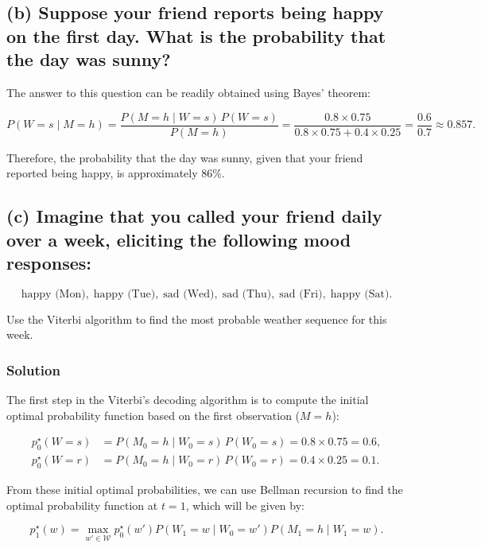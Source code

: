 \subsection*{(b) Suppose your friend reports being happy on the first day. What is the probability that the day was sunny?}

The answer to this question can be readily obtained using Bayes’ theorem:

\[
P(W=s \mid M=h)=
\frac{P(M=h \mid W=s)\,P(W=s)}{P(M=h)}
=
\frac{0.8\times0.75}{0.8\times0.75 + 0.4\times0.25}
=
\frac{0.6}{0.7}\approx0.857.
\]

Therefore, the probability that the day was sunny, given that your friend reported being
happy, is approximately $86\%$.

\subsection*{(c) Imagine that you called your friend daily over a week, eliciting the following mood responses:}

\[
\text{happy (Mon)},\;
\text{happy (Tue)},\;
\text{sad (Wed)},\;
\text{sad (Thu)},\;
\text{sad (Fri)},\;
\text{happy (Sat)}.
\]

Use the Viterbi algorithm to find the most probable weather sequence for this week.

\subsubsection*{Solution}


The first step in the Viterbi’s decoding algorithm is to compute the initial optimal probability
function based on the first observation ($M=h$):

\[
\begin{aligned}
p^\star_0(W=s) &= P(M_0=h \mid W_0=s)\,P(W_0=s)=0.8\times0.75 = 0.6,\\
p^\star_0(W=r) &= P(M_0=h \mid W_0=r)\,P(W_0=r)=0.4\times0.25 = 0.1.
\end{aligned}
\]

From these initial optimal probabilities, we can use Bellman recursion to find the optimal
probability function at $t=1$, which will be given by:

\[
p^\star_1(w)=\max_{w' \in \mathcal{W}}
p^\star_0(w')P(W_1=w \mid W_0=w')P(M_1=h \mid W_1=w).
\]

